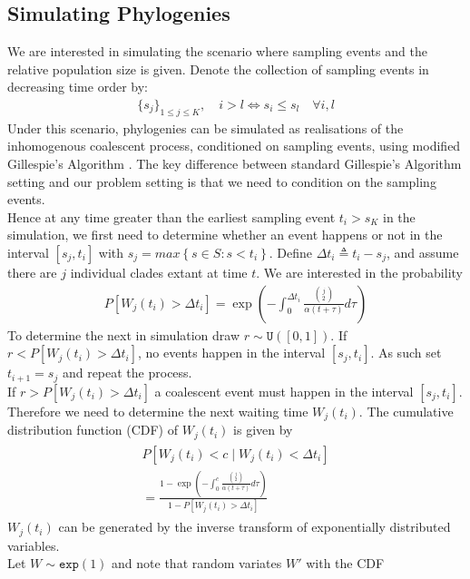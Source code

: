 \documentclass{ieeeaccess}
\theoremstyle{definition}
\begin{document}
\subsection{Simulating Phylogenies}
We are interested in simulating the scenario where sampling events and the relative population size is given. Denote the collection of sampling events in decreasing time order by:
\begin{gather}
\{s_j\}_{1\leq j\leq K}, \quad i>l \Leftrightarrow s_i \leq s_l\quad \forall i,l
\end{gather}
Under this scenario, phylogenies can be simulated as realisations of the inhomogenous coalescent process, conditioned on sampling events, using modified Gillespie's Algorithm \cite{erban_practical_nodate}. The key difference between standard Gillespie's Algorithm setting and our problem setting is that we need to condition on the sampling events.\\
Hence at any time greater than the earliest sampling event $t_i > s_K$ in the simulation, we first need to determine whether an event happens or not in the interval $[s_j, t_i]$ with $s_j = max\left\{s\in S : s<t_i\right\}$. Define $\Delta t_i \triangleq t_i-s_j$, and assume there are $j$ individual clades extant at time $t$. We are interested in the probability
\begin{gather*}
  P[W_j(t_i) > \Delta t_i] = \exp(-\int_0^{\Delta t_i}\frac{\binom{j}{2}}{\alpha(t+\tau)}d\tau)
\end{gather*}
To determine the next in simulation draw $r \sim \texttt{U}([0,1])$. 
If $r < P[W_j(t_i) > \Delta t_i]$, no events happen in the interval $[s_j, t_i]$. As such set $t_{i+1} = s_j$ and repeat the process.\\
If $r > P[W_j(t_i) > \Delta t_i]$ a coalescent event must happen in the interval $[s_j, t_i]$. Therefore we need to determine the next waiting time $W_j(t_i)$. The cumulative distribution function (CDF) of $W_j(t_i)$ is given by
\begin{gather}
\begin{aligned}
  P[W_j(t_i) < c \mid W_j(t_i) < \Delta t_i]\\
  = \frac{1-\exp(-\int_{0}^{c}{\frac{\binom{j}{2}}{\alpha(t+\tau)}d\tau})}{1-P[W_j(t_i) > \Delta t_i]}
\end{aligned}
\end{gather}
$W_j(t_i)$ can be generated by the inverse transform of exponentially distributed variables.\\ Let $W \sim \texttt{exp}(1)$ and note that random variates $W'$ with the CDF
\end{document}
